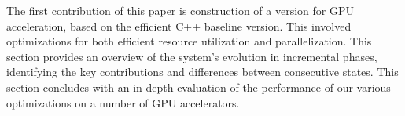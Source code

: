 
The first contribution of this paper is construction of a version for GPU
acceleration, based on the efficient C++ baseline version.
This involved optimizations for both efficient resource utilization and
parallelization.
This section provides an overview of the system's evolution in incremental
phases, identifying the key contributions and differences between consecutive
states. This section concludes with an in-depth evaluation of the performance
of our various optimizations on a number of GPU
accelerators.

% 


